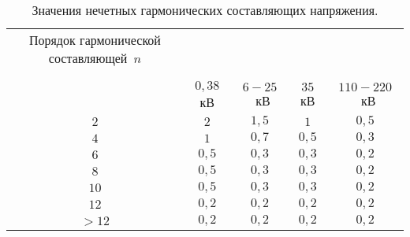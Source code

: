 \begin{table} [p]%
	\caption{Значения нечетных гармонических составляющих напряжения.}%
	\label{tbl:test3}%
	\begin{SingleSpace}
		\setlength\extrarowheight{6pt} %
		\setlength{\tymin}{1.9cm}%
		\begin{tabulary}{\textwidth}{@{}>{\zz}C >{\zz}C >{\zz}C >{\zz}C >{\zz}C @{}}%
			\toprule     %
			Порядок гармонической составляющей~$n$ & 
			  \\
			&
			\\		
			&
			 \\			
			&
			$0,38$ кВ &
			$6-25$~кВ &
			$35$ кВ  &
			$110-220$~кВ \\
			\midrule %
			$2$ &
			$2$ &
			$1,5$ &
			$1$ &
			$0,5$ \\
			
			$4$ &
			$1$ &
			$0,7$ &
			$0,5$&
			$0,3$ \\
			
			$6$ &
			$0,5$ &
			$0,3$ &
			$0,3$ &
			$0,2$ \\
			
			$8$ &
			$0,5$ &
			$0,3$ &
			$0,3$ &
			$0,2$ \\
			
			$10$ &
			$0,5$ &
			$0,3$ &
			$0,3$ &
			$0,2$ \\
			
			$12$ &
			$0,2$ &
			$0,2$ &
			$0,2$ &
			$0,2$ \\
			
			$>12$ &
			$0,2$ &
			$0,2$ &
			$0,2$ &
			$0,2$\\
			
			\bottomrule %
		\end{tabulary}%
	\end{SingleSpace}
\end{table}

